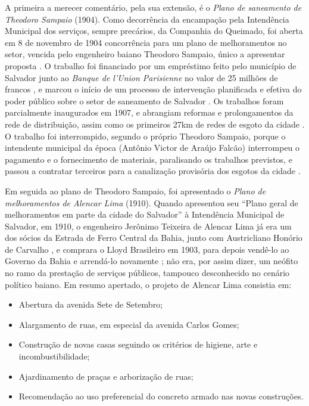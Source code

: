 A primeira a merecer comentário, pela sua extensão, é o \textit{Plano de saneamento de Theodoro Sampaio} (1904). Como decorrência da encampação pela Intendência Municipal dos serviços, sempre precários, da Companhia do Queimado, foi aberta em 8 de novembro de 1904 concorrência para um plano de melhoramentos no setor, vencida pelo engenheiro baiano Theodoro Sampaio, único a apresentar proposta \cite[150]{gordilhobarbosa_eau_2004}. O trabalho foi financiado por um empréstimo feito pelo município de Salvador junto ao \textit{Banque de l'Union Parisienne} no valor de 25 milhões de francos \cite[p.~150]{gordilhobarbosa_eau_2004}, e marcou o início de um processo de intervenção planificada e efetiva do poder público sobre o setor de saneamento de Salvador \cite[p.~150]{gordilhobarbosa_eau_2004}. Os trabalhos foram parcialmente inaugurados em 1907, e abrangiam reformas e prolongamentos da rede de distribuição, assim como os primeiros 27km de redes de esgoto da cidade \cite[p.~151]{gordilhobarbosa_eau_2004}. O trabalho foi interrompido, segundo o próprio Theodoro Sampaio, porque o intendente municipal da época (Antônio Victor de Araújo Falcão) interrompeu o pagamento e o fornecimento de materiais, paralisando os trabalhos previstos, e passou a contratar terceiros para a canalização provisória dos esgotos da cidade \cite[p.~152]{gordilhobarbosa_eau_2004}.

Em seguida ao plano de Theodoro Sampaio, foi apresentado o \textit{Plano de melhoramentos de Alencar Lima} (1910). Quando apresentou seu ``Plano geral de melhoramentos em parte da cidade do Salvador'' à Intendência Municipal de Salvador, em 1910, o engenheiro Jerônimo Teixeira de Alencar Lima já era um dos sócios da Estrada de Ferro Central da Bahia, junto com Austricliano Honório de Carvalho \cite{souza_trabalholivre_2011}, e comprara o Lloyd Brasileiro em 1903, para depois vendê-lo ao Governo da Bahia e arrendá-lo novamente \cite[p.~220]{CUNHA2011}; não era, por assim dizer, um neófito no ramo da prestação de serviços públicos, tampouco desconhecido no cenário político baiano. Em resumo apertado, o projeto de Alencar Lima consistia em:

\begin{itemize}
\item Abertura da avenida Sete de Setembro;
\item Alargamento de ruas, em especial da avenida Carlos Gomes;
\item Construção de novas casas seguindo os critérios de higiene, arte e incombustibilidade;
\item Ajardinamento de praças e arborização de ruas;
\item Recomendação ao uso preferencial do concreto armado nas novas construções.
\end{itemize}

